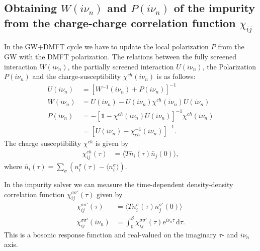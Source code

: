\documentclass[12pt,a4paper]{scrartcl}
\numberwithin{equation}{section}
\newcommand{\unity}{\mathds{1}}
\begin{document}
\subsection{Obtaining $W(i\nu_n)$ and $P(i\nu_n)$ of the impurity from 
the charge-charge correlation function  $\chi_{ij}$}
In the GW+DMFT cycle we have to update the local polarization $P$
from the GW with the DMFT polarization.
The relations between the fully screened interaction $W(i\nu_n)$, the partially
screened interaction $U(i\nu_n)$, the Polarization $P(i\nu_n)$ and the charge-susceptibility
$\chi^{ch}(i\nu_n)$ is as follows:
\begin{align}
 U(i\nu_n) &= \left[  W^{-1}(i\nu_n) + P(i\nu_n)  \right]^{-1} \\
 W(i\nu_n) &= U(i\nu_n) -U(i\nu_n) \chi^{ch}(i\nu_n)U(i\nu_n)  \\
 P(i\nu_n) &= -\left[ \unity - \chi^{ch}(i\nu_n)U(i\nu_n) \right]^{-1} \chi^{ch}(i\nu_n) \\
           &= \left[ U(i\nu_n) - \chi^{-1}_{ch}(i\nu_n) \right]^{-1}.
\end{align}
The charge susceptibility $\chi^{ch}$ is given by
\begin{align}
 \chi^{ch}_{ij}(\tau) 
 &= \langle T \bar{n}_i(\tau) \bar{n}_j(0) \rangle ,
\end{align}
where $\bar{n}_i(\tau) = \sum_{\sigma} \left( n^{\sigma}_i(\tau) - \langle n^{\sigma}_i\rangle \right)$.

In the impurity solver we can measure the time-dependent density-density
correlation function $\chi_{ij}^{\sigma\sigma'}(\tau)$ given by
\begin{align}
 \chi_{ij}^{\sigma\sigma'}(\tau) 
 &= \langle T n_i^{\sigma}(\tau) n_j^{\sigma'}(0) \rangle \\
 \chi_{ij}^{\sigma\sigma'}(i\nu_n) 
 &= \int_0^{\beta} \chi_{ij}^{\sigma\sigma'}(\tau) \mathrm{e}^{i\nu_n\tau} \,\mathrm{d}\tau.
\end{align}
This is a bosonic response function and real-valued on the imaginary $\tau$- and $i\nu_n$ axis.
\end{document}

